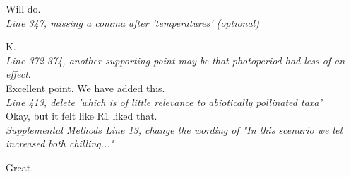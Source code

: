 \documentclass[11pt]{article}
\begin{document}
Will do.\\

\emph{Line 347, missing a comma after 'temperatures' (optional)}

K.\\

\emph{Line 372-374, another supporting point may be that photoperiod had less of an effect}.\\

Excellent point. We have added this.\\


\emph{Line 413, delete 'which is of little relevance to abiotically pollinated taxa'}\\

Okay, but it felt like R1 liked that.\\

\emph{Supplemental Methods Line 13, change the wording of "In this scenario we let increased both chilling..."}

Great.\\
\end{document}
